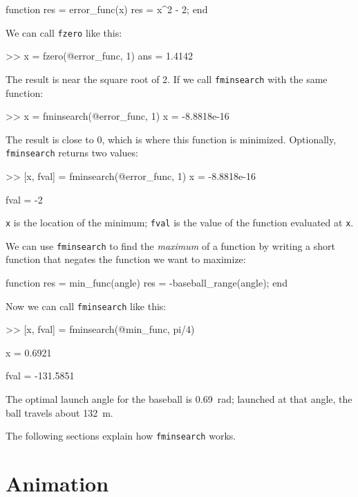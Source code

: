 \documentclass[
]{book}
\numberwithin{Answer}{chapter}
\numberwithin{Exercise}{chapter}
\begin{document}
\begin{code}
function res = error_func(x)
    res = x^2 - 2;
end
\end{code}

We can call {\tt fzero} like this:

\begin{code}
>> x = fzero(@error_func, 1)
ans = 1.4142
\end{code}

The result is near the square root of 2.  If we call {\tt fminsearch} with the same function:

\begin{code}
>> x = fminsearch(@error_func, 1)
x = -8.8818e-16
\end{code}

The result is close to 0, which is where this function is minimized.  Optionally, {\tt fminsearch} returns two values:

\begin{code}
>> [x, fval] = fminsearch(@error_func, 1)
x = -8.8818e-16

fval = -2
\end{code}

{\tt x} is the location of the minimum; {\tt fval} is the value of the function evaluated at {\tt x}.

We can use {\tt fminsearch} to find the {\em maximum} of a function by writing a short function that negates the function we want to maximize:

\begin{code}
function res = min_func(angle)
    res = -baseball_range(angle);
end
\end{code}

Now we can call {\tt fminsearch} like this:

\begin{code}
>> [x, fval] = fminsearch(@min_func, pi/4)

x = 0.6921

fval = -131.5851
\end{code}

The optimal launch angle for the baseball is \SI{0.69}{\radian}; launched at that angle, the ball travels about \SI{132}{\meter}.

The following sections explain how {\tt fminsearch} works.



\section{Animation}
\end{document}

